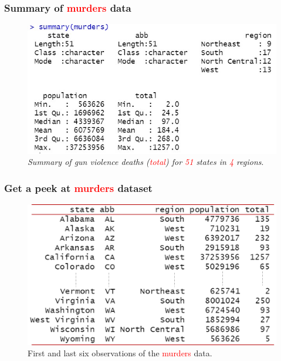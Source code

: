\documentclass{beamer}
\begin{document}
\begin{frame}[t]\frametitle{Summary of \textcolor{red}{murders} data}\vspace{5pt}
\begin{figure}
\includegraphics[width=0.99\linewidth]{PlotsLec1/MurdersSummary}
\caption{\textit{Summary of gun violence deaths (\textcolor{red}{total}) for \textcolor{red}{51} states in \textcolor{red}{4} regions}.}
\end{figure}
\end{frame}



\begin{frame}[t]\frametitle{Get a peek at \textcolor{red}{murders} dataset}\vspace{10pt}
\begin{figure}
\includegraphics[width=0.99\linewidth]{PlotsLec1/MurdersPeek}
\caption{First and last six observations of the \textcolor{red}{murders} data.}
\end{figure}
\end{frame}
\end{document}
